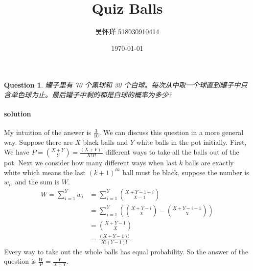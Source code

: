 \documentclass{article}
\title{Quiz Balls}
\author{吴怀瑾 518030910414}
\date{\today}
\newtheorem{question}[theorem]{Question}
\begin{document}
    \maketitle
\section{}
\begin{question}{}{}
    罐子里有 70 个黑球和 30 个白球。每次从中取一个球直到罐子中只含单色球为止。最后罐子中剩的都是白球的概率为多少?
\end{question}

\paragraph{solution}
My intuition of the answer is $\frac {3}{10}$. We can discuss this question in a more general way.
Suppose there are $X$ black balls and $Y$ white balls  in the pot initially. First, We have $P = \binom {X+Y} Y = \frac {(X+Y)!}{X!Y!}$ different ways to 
take all the balls out of the pot. Next we consider how many different ways when last $k$ balls are exactly white which means the last $(k+1)^{th}$ ball must be
black, suppose the number is $w_i$, and the sum is $W$.
\begin{align*}
    W = \sum_{i=1}^{Y} w_i &= \sum_{i=1}^{Y} \binom {X+Y-1-i} {X-1}\\
                           &= \sum_{i=1}^{Y} ( \binom {X+Y-i} {X} - \binom {X+Y-i-1} {X}) \\
                           &= \binom {X+Y-1} {X}\\
                           &= \frac{(X+Y-1)!}{X!(Y-1)!}
.\end{align*}
Every way to take out the whole balls has equal probability. So the answer of the question is $\frac W P = \frac {Y} {X+Y}$.
\end{document}

